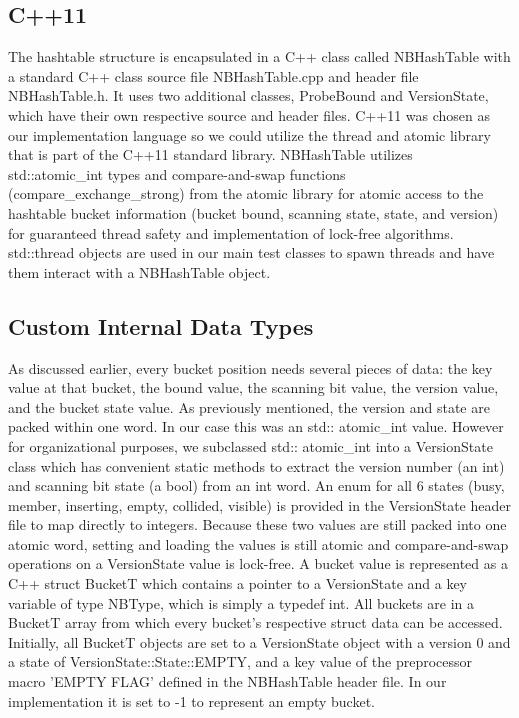 \documentclass[journal]{IEEEtran}
\begin{document}
\subsection{C++11}
The hashtable structure is encapsulated in a C++ class called NBHashTable with a standard C++ class source file NBHashTable.cpp and header file NBHashTable.h. It uses two additional classes, ProbeBound and VersionState, which have their own respective source and header files. C++11 was chosen as our implementation language so we could utilize the thread and atomic library that is part of the C++11 standard library. NBHashTable utilizes std::atomic\_int types and compare-and-swap functions (compare\_exchange\_strong) from the atomic library for atomic access to the hashtable bucket information (bucket bound, scanning state, state, and version) for guaranteed thread safety and implementation of lock-free algorithms. std::thread objects are used in our main test classes to spawn threads and have them interact with a NBHashTable object.

\subsection{Custom Internal Data Types}
As discussed earlier, every bucket position needs several pieces of data: the key value at that bucket, the bound value, the scanning bit value, the version value, and the bucket state value. As previously mentioned, the version and state are packed within one word. In our case this was an std:: atomic\_int value. However for organizational purposes, we subclassed std:: atomic\_int into a VersionState class which has convenient static methods to extract the version number (an int) and scanning bit state (a bool) from an int word. An enum for all 6 states (busy, member, inserting, empty, collided, visible) is provided in the VersionState header file to map directly to integers. Because these two values are still packed into one atomic word, setting and loading the values is still atomic and compare-and-swap operations on a VersionState value is lock-free.
 A bucket value is represented as a C++ struct BucketT which contains a pointer to a VersionState and a key variable of type NBType, which is simply a typedef int. All buckets are in a BucketT array from which every bucket’s respective struct data can be accessed. Initially, all BucketT objects are set to a VersionState object with a version 0 and a state of VersionState::State::EMPTY, and a key value of the preprocessor macro ’EMPTY FLAG’ defined in the NBHashTable header file. In our implementation it is set to -1 to represent an empty bucket.
 
\end{document}
